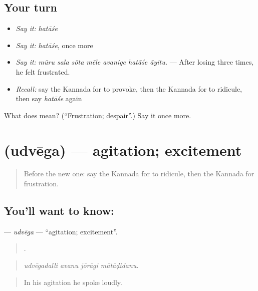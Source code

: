 \subsection*{Your turn}
\begin{itemize}
\raggedright
  \item \emph{Say it:} \emph{hatāśe}
  \item \emph{Say it:} \emph{hatāśe}, once more
  \item \emph{Say it:} \emph{mūru sala sōta mēle avanige hatāśe āyitu.} — After losing three times, he felt frustrated.
  \item \emph{Recall:} say the Kannada for to provoke, then the Kannada for to ridicule, then say \emph{hatāśe} again
\end{itemize}

\begin{tcolorbox}[breakable,colback=teal!4,colframe=teal!35!black,title={Before you move on}]
What does  mean? (\textquotedblleft{}Frustration; despair\textquotedblright{}.) Say it once more.
\end{tcolorbox}
\section[\texorpdfstring{\kn{ಉದ್ವೇಗ} (udvēga)}{ಉದ್ವೇಗ (udvēga)}]{ (udvēga) — agitation; excitement}

\label{lesson:KA-C493-udvega}



\begin{quote}
Before the new one: say the Kannada for to ridicule, then the Kannada for frustration.
\end{quote}

\subsection*{You'll want to know: }
\textbf{} — \emph{udvēga} — \textquotedblleft{}agitation; excitement\textquotedblright{}.

\begin{quote}
   .
\end{quote}

\begin{quote}
\emph{udvēgadalli avanu jōrāgi mātāḍidanu.}
\end{quote}

\begin{quote}
In his agitation he spoke loudly.
\end{quote}

